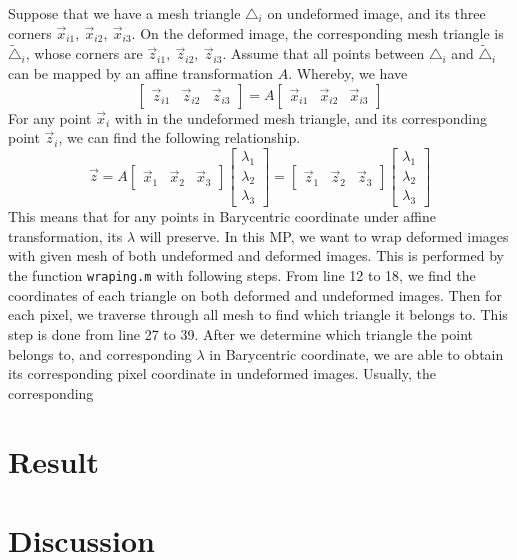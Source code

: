 \documentclass{article}
\begin{document}
	 Suppose that we have a mesh triangle $\triangle_i$ on undeformed image, and its three corners $\overrightarrow{x}_{i1},~ \overrightarrow{x}_{i2},~\overrightarrow{x}_{i3}$. On the deformed image, the corresponding mesh triangle is $\tilde{\triangle}_i$, whose corners are  $\overrightarrow{z}_{i1},~ \overrightarrow{z}_{i2},~\overrightarrow{z}_{i3}$. Assume that all points between ${\triangle}_i$ and $\tilde{\triangle}_i$ can be mapped by an affine transformation $A$. Whereby, we have
	\begin{equation}
	\begin{bmatrix}
	\overrightarrow{z}_{i1} &\overrightarrow{z}_{i2}&\overrightarrow{z}_{i3}
	\end{bmatrix}=A\begin{bmatrix}
	\overrightarrow{x}_{i1} &\overrightarrow{x}_{i2}&\overrightarrow{x}_{i3}
	\end{bmatrix}
	\end{equation}
	For any point $\overrightarrow{x}_{i}$ with in the undeformed mesh triangle, and its corresponding point $\overrightarrow{z}_{i}$, we can find the following relationship.
	\begin{equation}
	\overrightarrow{z}=A\begin{bmatrix}
	\overrightarrow{x}_1 & \overrightarrow{x}_2 & \overrightarrow{x}_3
	\end{bmatrix}\begin{bmatrix}
	\lambda_1\\ \lambda_2\\ \lambda_3
	\end{bmatrix}=\begin{bmatrix}
	\overrightarrow{z}_1 & \overrightarrow{z}_2 & \overrightarrow{z}_3
	\end{bmatrix}\begin{bmatrix}
	\lambda_1\\ \lambda_2\\ \lambda_3
	\end{bmatrix}
	\end{equation}
	This means that for any points in Barycentric coordinate under affine transformation, its $\lambda$ will preserve. In this MP, we want to wrap deformed images with given mesh of both undeformed and deformed images. This is performed by the function \texttt{wraping.m} with following steps. From line 12 to 18, we find the coordinates of each triangle on both deformed and undeformed images. Then for each pixel, we traverse through all mesh to find which triangle it belongs to. This step is done from line 27 to 39. After we determine which triangle the point belongs to, and corresponding $\lambda$ in Barycentric coordinate, we are able to obtain its corresponding pixel coordinate in undeformed images. Usually, the corresponding 
	
	
	
	
	\section{Result}
	
	
	\section{Discussion}
	
\end{document}
